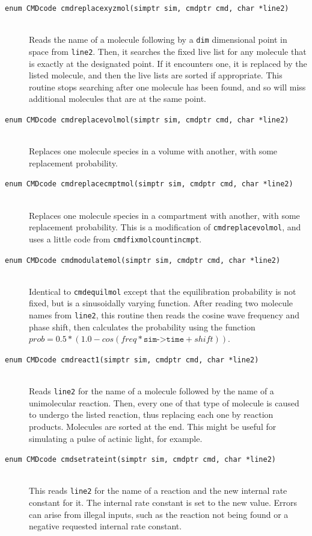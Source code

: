 \documentclass {scrbook}
\newcommand {\ttt} {\texttt}
\begin{document}
\begin{description}
\item[\ttt{enum CMDcode cmdreplacexyzmol(simptr sim, cmdptr cmd, char *line2)}]
\hfill \\
Reads the name of a molecule following by a \ttt{dim} dimensional point in space from \ttt{line2}. Then, it searches the fixed live list for any molecule that is exactly at the designated point. If it encounters one, it is replaced by the listed molecule, and then the live lists are sorted if appropriate. This routine stops searching after one molecule has been found, and so will miss additional molecules that are at the same point.

\item[\ttt{enum CMDcode cmdreplacevolmol(simptr sim, cmdptr cmd, char *line2)}]
\hfill \\
Replaces one molecule species in a volume with another, with some replacement probability.

\item[\ttt{enum CMDcode cmdreplacecmptmol(simptr sim, cmdptr cmd, char *line2)}]
\hfill \\
Replaces one molecule species in a compartment with another, with some replacement probability. This is a modification of \ttt{cmdreplacevolmol}, and uses a little code from \ttt{cmdfixmolcountincmpt}.

\item[\ttt{enum CMDcode cmdmodulatemol(simptr sim, cmdptr cmd, char *line2)}]
\hfill \\
Identical to \ttt{cmdequilmol} except that the equilibration probability is not fixed, but is a sinusoidally varying function. After reading two molecule names from \ttt{line2}, this routine then reads the cosine wave frequency and phase shift, then calculates the probability using the function $prob=0.5*(1.0-cos(freq*\ttt{sim->time}+shift))$.

\item[\ttt{enum CMDcode cmdreact1(simptr sim, cmdptr cmd, char *line2)}]
\hfill \\
Reads \ttt{line2} for the name of a molecule followed by the name of a unimolecular reaction. Then, every one of that type of molecule is caused to undergo the listed reaction, thus replacing each one by reaction products. Molecules are sorted at the end. This might be useful for simulating a pulse of actinic light, for example.

\item[\ttt{enum CMDcode cmdsetrateint(simptr sim, cmdptr cmd, char *line2)}]
\hfill \\
This reads \ttt{line2} for the name of a reaction and the new internal rate constant for it. The internal rate constant is set to the new value. Errors can arise from illegal inputs, such as the reaction not being found or a negative requested internal rate constant.


\end{description}
\end{document}
